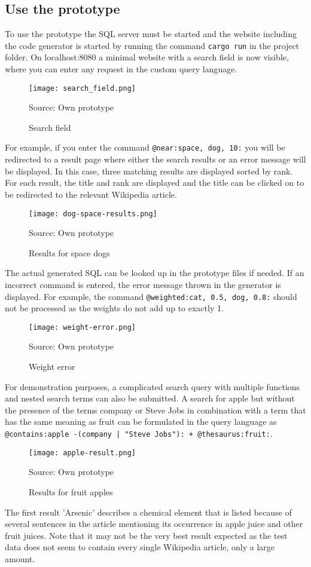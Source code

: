 \subsection{Use the prototype}
To use the prototype the \ac{SQL} server must be started and the website including the code generator is started by running the command \lstinline$cargo run$ in the project folder. On localhost:8080 a minimal website with a search field is now visible, where you can enter any request in the custom query language.
\begin{figure}[H]
    \caption{Search field}
    \label{fig:search}
    \texttt{[image: search\_field.png]}
    \\
    \centerline{Source: Own prototype}
\end{figure}
For example, if you enter the command \lstinline[language=Fulltext-Search]$@near:space, dog, 10:$ you will be redirected to a result page where either the search results or an error message will be displayed. In this case, three matching results are displayed sorted by rank. For each result, the title and rank are displayed and the title can be clicked on to be redirected to the relevant Wikipedia article.
\begin{figure}[H]
    \caption{Results for space dogs}
    \label{fig:space-dog}
    \texttt{[image: dog-space-results.png]}
    \\
    \centerline{Source: Own prototype}
\end{figure}
The actual generated \ac{SQL} can be looked up in the prototype files if needed. If an incorrect command is entered, the error message thrown in the generator is displayed. For example, the command \lstinline[language=Fulltext-Search]$@weighted:cat, 0.5, dog, 0.8:$ should not be processed as the weights do not add up to exactly 1.
\begin{figure}[H]
    \caption{Weight error}
    \label{fig:weight-error}
    \texttt{[image: weight-error.png]}
    \\
    \centerline{Source: Own prototype}
\end{figure}
For demonstration purposes, a complicated search query with multiple functions and nested search terms can also be submitted. A search for apple but without the presence of the terms company or Steve Jobs in combination with a term that has the same meaning as fruit can be formulated in the query language as \lstinline[language=Fulltext-Search]$@contains:apple -(company | "Steve Jobs"): + @thesaurus:fruit:$.
\begin{figure}[H]
    \caption{Results for fruit apples}
    \label{fig:apple-fruit}
    \texttt{[image: apple-result.png]}
    \\
    \centerline{Source: Own prototype}
\end{figure}
The first result 'Arsenic' describes a chemical element that is listed because of several sentences in the article mentioning its occurrence in apple juice and other fruit juices. Note that it may not be the very best result expected as the test data does not seem to contain every single Wikipedia article, only a large amount.